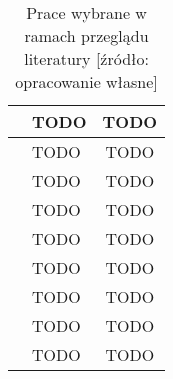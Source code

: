 \begin{table}[!ht]
\begin{tabular}{|c|l|c|}
    \hline
    \cite{9027427} & TODO & TODO \\
    \hline
    \cite{8513710} & TODO & TODO \\
    \hline
    \cite{Cavalheiro202389} & TODO & TODO \\
    \hline
    \cite{raza2021sok} & TODO & TODO \\
    \hline
    \cite{LEITNER2019340} & TODO & TODO \\
    \hline
    \cite{eismann2021reviewserverlessusecases} & TODO & TODO \\
    \hline
    \cite{Ivanov_Petrova_2024} & TODO & TODO \\
    \hline
    \cite{9946331} & TODO & TODO \\
    \hline
    \cite{10.1145/3419111.3421280} & TODO & TODO \\
    \hline
    \end{tabular}
    \caption{Prace wybrane w ramach przeglądu literatury [źródło: opracowanie własne]}
    \label{table:research_papers_results}
\end{table}
